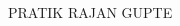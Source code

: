 
\begin{titlepage}
    \begin{addmargin}[-1cm]{-3cm}
        \linespread{1.5}

        \hfill


        {
           \par
        }

        \vspace{81mm}

        \sffamily\huge{PRATIK RAJAN GUPTE}

        \vfill




        \vfill

  \end{addmargin}
\end{titlepage}

\nopagecolor
